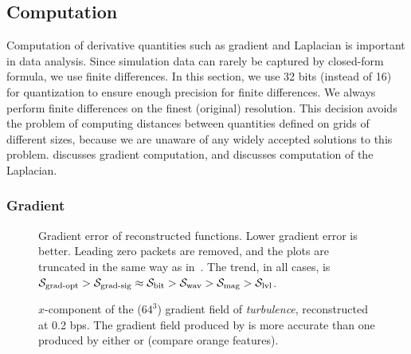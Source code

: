 \subsection{ Computation } \label{sec:derivatives}

Computation of derivative quantities such as gradient and Laplacian is
important in data analysis. Since simulation data can rarely be captured by
closed-form formula, we use finite differences. In this section, we
use 32 bits (instead of 16) for quantization to ensure enough precision for
finite differences. We always perform finite differences on the finest
(original) resolution. This decision avoids the problem of computing distances
between quantities defined on grids of different sizes, because we are unaware
of any widely accepted solutions to this problem.  
discusses gradient computation, and  discusses computation
of the Laplacian.

\subsubsection{Gradient } \label{sec:gradient}

\begin{figure*}[t]
\centering
{}
\caption{Gradient error of reconstructed functions. Lower gradient error is
better. Leading zero packets are removed, and the plots are truncated in the
same way as in~. The trend, in all cases, is $\sgop >
\sgsg \approx \sbit > \swav > \smag > \slvl$.}
\label{fig:gradient-error-comparison}
\vspace{1em}

\centering
{}
\caption{$x$-component of the ($64^3$) gradient field of \emph{turbulence},
reconstructed at 0.2 bps. The gradient field produced by \sbit is more accurate
than one produced by either \swav or \sgsg (compare orange features).}
\label{fig:gradient-rendering-diff}
\end{figure*}

